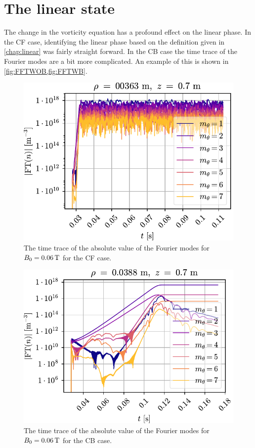 \section{The linear state}
%
The change in the vorticity equation has a profound effect on the linear phase.
In the CF case, identifying the linear phase based on the definition given in \cref{chap:linear} was fairly straight forward.
In the CB case the time trace of the Fourier modes are a bit more complicated.
An example of this is shown in \cref{fig:FFTWOB,fig:FFTWB}.
%
\begin{figure}[htb]
    \centering
    \includegraphics{fig/results/compareBouss/FFT006}
    \caption{The time trace of the absolute value of the Fourier modes for $B_0=0.06\, \text{T}$ for the CF case.}
    \label{fig:FFTWOB}
\end{figure}
%
\begin{figure}[htb]
    \centering
    \includegraphics{fig/results/compareBouss/FFT006B}
    \caption{The time trace of the absolute value of the Fourier modes for $B_0=0.06\, \text{T}$ for the CB case.}
    \label{fig:FFTWB}
\end{figure}
